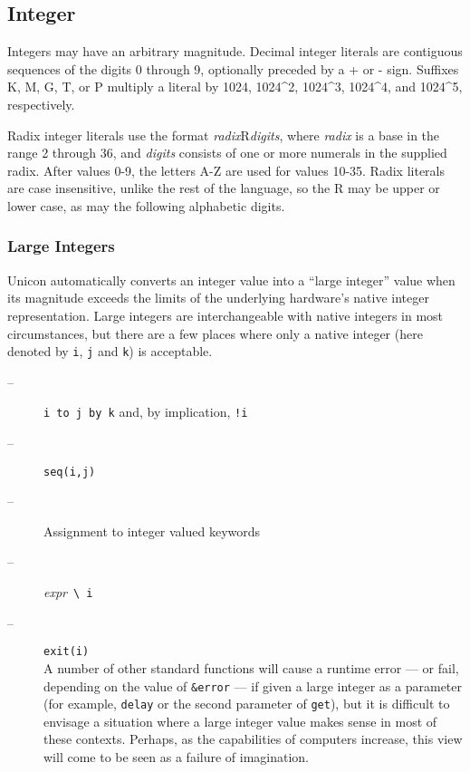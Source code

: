 \subsection*{Integer}

Integers may have an arbitrary magnitude. Decimal integer
literals are contiguous sequences of the digits 0 through 9, optionally
preceded by a + or - sign.  Suffixes K, M, G, T, or P multiply
a literal by 1024, 1024\^{}2, 1024\^{}3, 1024\^{}4, and
1024\^{}5, respectively.

Radix integer literals use the format
\textit{radix}R\textit{digits}, where \textit{radix} is a base in the
range 2 through 36, and \textit{digits} consists of one or more
numerals in the supplied radix. After values 0-9, the letters A-Z are
used for values 10-35. Radix literals are case insensitive, unlike the
rest of the language, so the R may be upper or lower case, as may the
following alphabetic digits.

\subsubsection{Large Integers}
Unicon automatically converts an integer value into a ``large
integer'' value when its magnitude exceeds the limits of the
underlying hardware's native integer representation. Large integers
are interchangeable with native integers in most circumstances, but
there are a few places where only a native integer (here denoted by
\texttt{i}, \texttt{j} and \texttt{k}) is acceptable.
\begin{description}
\item[--] \texttt{i to j by k} and, by implication, \texttt{!i}
\item[--] \texttt{seq(i,j)}
\item[--] Assignment to integer valued keywords
\item[--] \textit{expr}~\verb+\+~\texttt{i}
\item[--] \texttt{exit(i)}\\
  A number of other standard functions will cause a runtime error ---
  or fail, depending on the value of \texttt{\&error} --- if given a
  large integer as a parameter (for example, \texttt{delay} or the
  second parameter of \texttt{get}), but it is difficult to envisage a
  situation where a large integer value makes sense in most of these
  contexts. Perhaps, as the capabilities of computers increase, this
  view will come to be seen as a failure of imagination.
\end{description}

